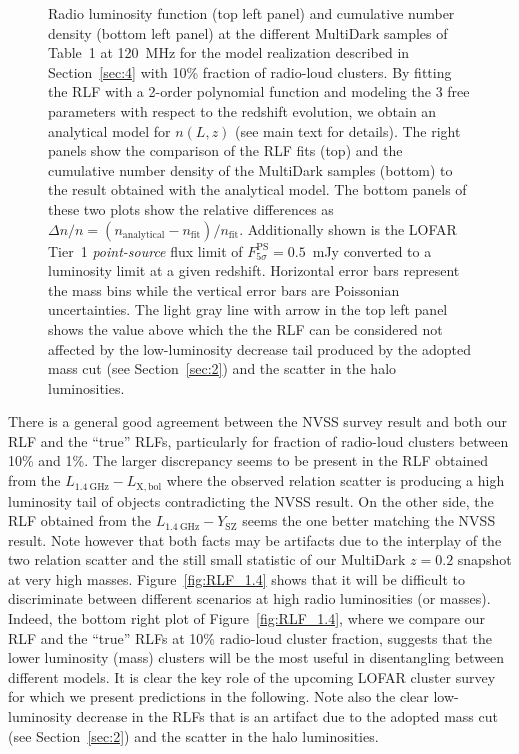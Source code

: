 \documentclass[traditabstract]{aa}
\newcommand{\rmn}{\mathrm}
\begin{document}
\begin{figure}[t]
\caption{Radio luminosity function (top left panel) and cumulative number density (bottom left panel) at the different MultiDark samples of Table~1 at 120~MHz for the model realization described in Section~\ref{sec:4} with 10\% fraction of radio-loud clusters. By fitting the RLF with a 2-order polynomial function and modeling the 3 free parameters with respect to the redshift evolution, we obtain an analytical model for $n(L,z)$ (see main text for details). The right panels show the comparison of the RLF fits (top) and the cumulative number density of the MultiDark samples (bottom) to the result obtained with the analytical model. The bottom panels of these two plots show the relative differences as $\Delta n / n = (n_{\rmn{analytical}} - n_{\rmn{fit}})/n_{\rmn{fit}}$. Additionally shown is the LOFAR Tier~1 \emph{point-source} flux limit of $F_{5\sigma}^{\rmn{PS}}=0.5$~mJy \citep{2012JApA..tmp...34R} converted to a luminosity limit at a given redshift. Horizontal error bars represent the mass bins while the vertical error bars are Poissonian uncertainties. The light gray line with arrow in the top left panel shows the value above which the the RLF can be considered not affected by the low-luminosity decrease tail produced by the adopted mass cut (see Section~\ref{sec:2}) and the scatter in the halo luminosities.}
\label{fig:RLF_120}
\end{figure} 
 
There is a general good agreement between the NVSS survey result and both our RLF and the ``true'' RLFs, particularly for fraction of radio-loud clusters between 10\% and 1\%. The larger discrepancy seems to be present in the RLF obtained from the $L_{1.4~\rmn{GHz}}-L_{\rmn{X,bol}}$ where the  observed relation scatter is producing a high luminosity tail of objects contradicting the NVSS result. On the other side, the RLF obtained from the $L_{1.4~\rmn{GHz}}-Y_{\rmn{SZ}}$ seems the one better matching the NVSS result. 
Note however that both facts may be artifacts due to the interplay of the two relation scatter and the still small statistic of our MultiDark $z = 0.2$ snapshot at very high masses. Figure~\ref{fig:RLF_1.4} shows that it will be difficult to discriminate between different scenarios at high radio luminosities (or masses). Indeed, the bottom right plot of Figure~\ref{fig:RLF_1.4}, where we compare our RLF and the ``true'' RLFs at 10\% radio-loud cluster fraction, suggests that the lower luminosity (mass) clusters will be the most useful in disentangling between different models. It is clear the key role of the upcoming LOFAR cluster survey for which we present predictions in the following. Note also the clear low-luminosity decrease in the RLFs that is an artifact due to the adopted mass cut (see Section~\ref{sec:2}) and the scatter in the halo luminosities.
\end{document}
